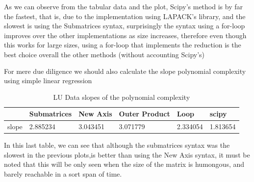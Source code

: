 As we can observe from the tabular data and the plot, Scipy's method is by far the fastest, that is, due to the implementation using LAPACK's library, and the slowest is using the Submatrices syntax, surprisingly the syntax using a for-loop improves over the other implementations as size increases, therefore even though this works for large sizes, using a for-loop that implements the reduction is the best choice overall the other methods (without accounting Scipy's) 

For mere due diligence we should also calculate the slope polynomial complexity using simple linear regression
\begin{table}[H]
    \centering
    \begin{tabular}{|l|l|l|l|l|l|}
    \hline
        \textbf{} & \textbf{Submatrices} & \textbf{New Axis} & \textbf{Outer Product} & \textbf{Loop} & \textbf{scipy} \\ \hline
        slope & 2.885234 & 3.043451 & 3.071779 & 2.334054 & 1.813654 \\ \hline
    \end{tabular}
    \caption{LU Data slopes of the polynomial complexity}
\end{table}
In this last table, we can see that although the submatrices syntax was the slowest in the previous plots,is better than using the New Axis syntax, it must be noted that this will be only seen when the size of the matrix is humongous, and barely reachable in a sort span of time. 